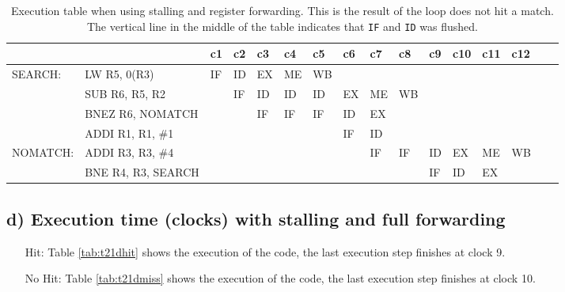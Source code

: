\begin{landscape}
    \begin{table}[]
    \centering
    \begin{tabular}{llllllllllllllll}
    \hline
             &                                         & c1 & c2 & c3 & c4 & c5 & c6 & c7                      & c8 & c9 & c10 & c11 & c12 \\ \hline
    SEARCH:  & \multicolumn{1}{l|}{LW R5, 0(R3)}       & IF & ID & EX & ME & WB &    &                         &    &    &     &     &     \\
             & \multicolumn{1}{l|}{SUB R6, R5, R2}     &    & IF & ID & ID & ID & EX & ME                      & WB &    &     &     &     \\
             & \multicolumn{1}{l|}{BNEZ R6, NOMATCH}   &    &    & IF & IF & IF & ID & EX                      &    &    &     &     &     \\
             & \multicolumn{1}{l|}{ADDI R1, R1, \#1}   &    &    &    &    &    & IF & \multicolumn{1}{l|}{ID} &    &    &     &     &     \\
    NOMATCH: & \multicolumn{1}{l|}{ADDI R3, R3, \#4}   &    &    &    &    &    &    & \multicolumn{1}{l|}{IF} & IF & ID & EX  & ME  & WB  \\
             & \multicolumn{1}{l|}{BNE R4, R3, SEARCH} &    &    &    &    &    &    &                         &    & IF & ID  & EX  &     \\ \hline
    \end{tabular}
    \caption{Execution table when using stalling and register forwarding. This is the result of the loop does not hit a match. The vertical line in the middle of the table indicates that \texttt{IF} and \texttt{ID} was flushed.}
    \label{tab:t21cmiss}
    \end{table}

\end{landscape}

\subsection{d) Execution time (clocks) with stalling and full forwarding}
\begin{itemize}
    \item[Hit: ] Table \ref{tab:t21dhit} shows  the execution of the code, the
    last execution step finishes at clock 9.

    \item[No Hit: ] Table \ref{tab:t21dmiss} shows  the execution of the code, the
    last execution step finishes at clock 10.
\end{itemize}


